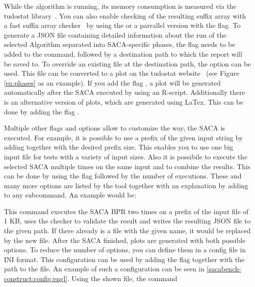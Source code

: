 While the algorithm is running, its memory consumption is measured via the tudostat library~\cite{tudostat}.
You can also enable checking of the resulting suffix array with a fast suffix array checker~\cite{saca:11} by
using the  or a parrallel version with the  flag.
To generate a JSON file containing detailed information about the run of the selected Algorithm separated into SACA-specific phases,
the flag  needs to be added to the command, followed by a destination path to which the report will be saved to.
To override an existing file at the destination path, the option  can be used.
This file can be converted to a plot on the tudostat website~\cite{tudostat} (see Figure \ref{ea:phases} as an example).
If you add the flag , a plot will be generated automatically after the SACA executed by using an R-script.
Additionally there is an alternative version of plots, which are generated using LaTex.
This can be done by adding the flag .

Multiple other flags and options allow to customize the way, the SACA is executed.
For example, it is possible to use a prefix of the given input string by adding  together with the desired prefix size. 
This enables you to use one big input file for tests with a variety of input sizes.
Also it is possibile to execute the selected SACA multiple times on the same input and to combine the results.
This can be done by using the flag  followed by the number of executions.
These and many more options are listed by the tool together with an explanation by adding  to any subcommand.
An example would be:


This command executes the SACA BPR two times on a prefix of the input file of 1 KB, 
uses the checker to validate the result and writes the resulting JSON file to the given path.
If there already is a file with the given name, it would be replaced by the new file.
After the SACA finished, plots are generated with both possible options.
To reduce the number of options, you can define them in a config file in INI format.
This configuration can be used by adding the flag  together with the path to the file.
An example of such a configuration can be seen in \ref{sacabench-construct:config:engl}.
Using the shown file, the command 

